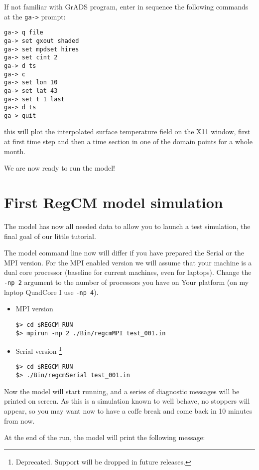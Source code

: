 If not familiar with GrADS program, enter in sequence the following commands at
the \verb=ga->= prompt:

\begin{Verbatim}
ga-> q file
ga-> set gxout shaded
ga-> set mpdset hires
ga-> set cint 2
ga-> d ts
ga-> c
ga-> set lon 10
ga-> set lat 43
ga-> set t 1 last
ga-> d ts
ga-> quit
\end{Verbatim}

this will plot the interpolated surface temperature field on the X11 window,
first at first time step and then a time section in one of the domain points
for a whole month.

We are now ready to run the model!

\section{First RegCM model simulation}

The model has now all needed data to allow you to launch a test simulation,
the final goal of our little tutorial.

The model command line now will differ if you have prepared the Serial or the
MPI version. For the MPI enabled version we will assume that your machine is
a dual core processor (baseline for current machines, even for laptops).
Change the \verb=-np 2= argument to the number of processors you have on
Your platform (on my laptop QuadCore I use \verb=-np 4=).

\begin{itemize}
\item MPI version
\begin{Verbatim}
$> cd $REGCM_RUN
$> mpirun -np 2 ./Bin/regcmMPI test_001.in
\end{Verbatim}
\item Serial version \footnote{Deprecated. Support will be dropped in future
releases.}
\begin{Verbatim}
$> cd $REGCM_RUN
$> ./Bin/regcmSerial test_001.in
\end{Verbatim}
\end{itemize}

Now the model will start running, and a series of diagnostic messages will be
printed on screen. As this is a simulation known to well behave, no stoppers
will appear, so you may want now to have a coffe break and come back in 10
minutes from now.

At the end of the run, the model will print the following message:

